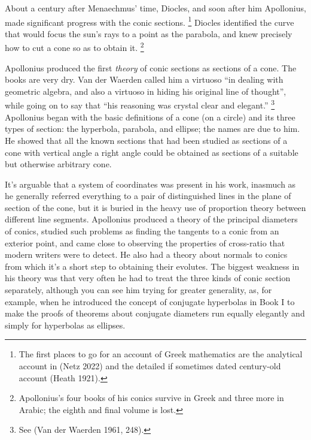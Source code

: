About a century after Menaechmus' time, Diocles, and soon
after him Apollonius, made significant progress with the conic
sections.%
%
\footnote{The first places to go for an account of Greek
mathematics are the analytical account in (Netz 2022) and the detailed
if sometimes dated century-old account (Heath 1921).}
%
Diocles identified the curve that would focus the sun's rays to a point
as the parabola, and knew precisely how to cut a cone so as to obtain it.%
%
\footnote{Apollonius's four books of his conics survive in Greek and
three more in Arabic; the eighth and final volume is lost.}


Apollonius produced the first \emph{theory} of conic sections as sections
of a cone.
The books are very dry. Van der Waerden called him a virtuoso ``in dealing
with geometric algebra, and also a virtuoso in hiding his original line
of thought'', while going on to say that ``his reasoning was crystal
clear and elegant.''%
%
\footnote{See (Van der Waerden 1961, 248).}
%
Apollonius began with the basic definitions of a cone (on a circle)
and its three types of section: the hyperbola, parabola, and ellipse;
the names are due to him. He showed that all the known sections that
had been studied as sections of a cone with vertical angle a right angle
could be obtained as sections of a suitable but otherwise arbitrary cone.

It's  arguable that a system of coordinates was present in his work,
inasmuch as he generally referred everything to a pair of distinguished
lines in the plane of section of the cone, but it is buried in the heavy
use of proportion theory between different line segments.
Apollonius produced a theory of the principal diameters of conics, studied
such problems as finding the tangents to a conic from an exterior point,
and came close to observing the properties of cross-ratio that modern
writers were to detect. He also had a theory about normals to conics
from which  it's a short step to obtaining their evolutes.
The biggest weakness in his theory was that very often he had to treat
the three kinds of conic section separately, although you can see him
trying for greater generality, as, for example, when he introduced the
concept of conjugate hyperbolas in Book I to make the proofs of theorems
about conjugate diameters run equally elegantly and simply for hyperbolas
as ellipses.




